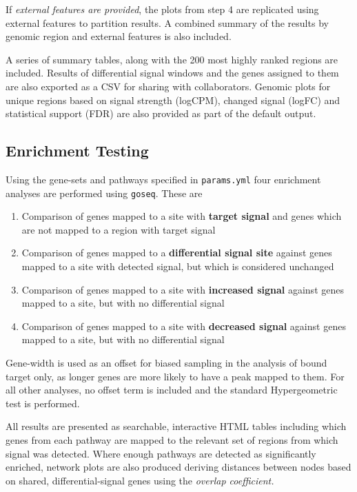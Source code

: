 \documentclass[
]{book}
\providecommand{\tightlist}{%
  \setlength{\itemsep}{0pt}\setlength{\parskip}{0pt}}
\begin{document}
If \emph{external features are provided}, the plots from step 4 are replicated using external features to partition results.
A combined summary of the results by genomic region and external features is also included.

A series of summary tables, along with the 200 most highly ranked regions are included.
Results of differential signal windows and the genes assigned to them are also exported as a CSV for sharing with collaborators.
Genomic plots for unique regions based on signal strength (logCPM), changed signal (logFC) and statistical support (FDR) are also provided as part of the default output.

\hypertarget{enrichment-testing}{%
\subsection*{Enrichment Testing}\label{enrichment-testing}}

Using the gene-sets and pathways specified in \texttt{params.yml} four enrichment analyses are performed using \texttt{goseq}\citep{goseq}.
These are

\begin{enumerate}
\def\labelenumi{\arabic{enumi}.}
\tightlist
\item
  Comparison of genes mapped to a site with \textbf{target signal} and genes which are not mapped to a region with target signal
\item
  Comparison of genes mapped to a \textbf{differential signal site} against genes mapped to a site with detected signal, but which is considered unchanged
\item
  Comparison of genes mapped to a site with \textbf{increased signal} against genes mapped to a site, but with no differential signal
\item
  Comparison of genes mapped to a site with \textbf{decreased signal} against genes mapped to a site, but with no differential signal
\end{enumerate}

Gene-width is used as an offset for biased sampling in the analysis of bound target only, as longer genes are more likely to have a peak mapped to them.
For all other analyses, no offset term is included and the standard Hypergeometric test is performed.

All results are presented as searchable, interactive HTML tables including which genes from each pathway are mapped to the relevant set of regions from which signal was detected.
Where enough pathways are detected as significantly enriched, network plots are also produced deriving distances between nodes based on shared, differential-signal genes using the \emph{overlap coefficient.}
\end{document}
